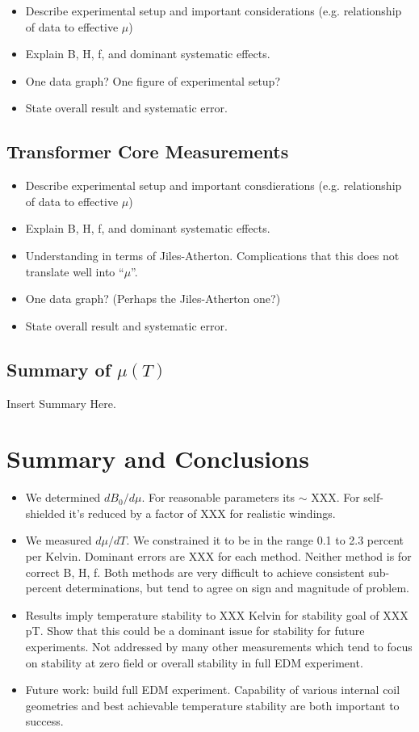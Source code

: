 \documentclass[review]{elsarticle}
\begin{document}
\begin{itemize}
\item Describe experimental setup and important considerations
  (e.g. relationship of data to effective $\mu$)
\item Explain B, H, f, and dominant systematic effects.
\item One data graph?  One figure of experimental setup?
\item State overall result and systematic error.
\end{itemize}

\subsection{Transformer Core Measurements}

\begin{itemize}
\item Describe experimental setup and important consdierations (e.g. relationship of data to effective $\mu$)
\item Explain B, H, f, and dominant systematic effects.
\item Understanding in terms of Jiles-Atherton.  Complications that
  this does not translate well into ``$\mu$''.
\item One data graph?  (Perhaps the Jiles-Atherton one?)
\item State overall result and systematic error.
\end{itemize}

\subsection{Summary of $\mu(T)$}

Insert Summary Here.

\section{Summary and Conclusions}

\begin{itemize}
\item We determined $dB_0/d\mu$.  For reasonable parameters its $\sim$ XXX.  For self-shielded it's reduced by a factor of XXX for realistic windings.
\item We measured $d\mu/dT$.  We constrained it to be in the range 0.1
  to 2.3 percent per Kelvin.  Dominant errors are XXX for each method.
  Neither method is for correct B, H, f.  Both methods are very
  difficult to achieve consistent sub-percent determinations, but tend
  to agree on sign and magnitude of problem.
\item Results imply temperature stability to XXX Kelvin for stability
  goal of XXX pT.  Show that this could be a dominant issue for
  stability for future experiments.  Not addressed by many other
  measurements which tend to focus on stability at zero field or
  overall stability in full EDM experiment.
\item Future work: build full EDM experiment.  Capability of various
  internal coil geometries and best achievable temperature stability
  are both important to success.
\end{itemize}
\end{document}
